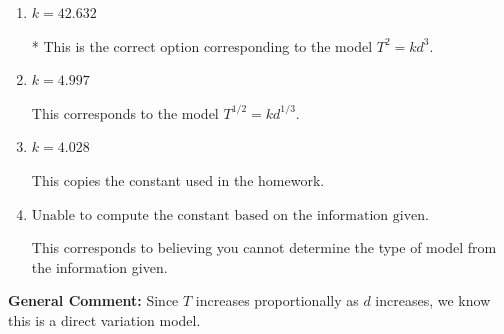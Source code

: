 \documentclass{extbook}[14pt]
\begin{document}
\begin{enumerate}
{\begin{enumerate}[label=\Alph*.]
This corresponds to the model $T^{2} = \frac{k}{d^{3}}$.
\item \( k = 42.632 \)

* This is the correct option corresponding to the model $T^{2} = k d^{3}$.
\item \( k = 4.997 \)

This corresponds to the model $T^{1/2} = k d^{1/3}$.
\item \( k = 4.028 \)

This copies the constant used in the homework.
\item \( \text{Unable to compute the constant based on the information given.} \)

This corresponds to believing you cannot determine the type of model from the information given.
\end{enumerate}

\textbf{General Comment:} Since $T$ increases proportionally as $d$ increases, we know this is a direct variation model.
}
\end{enumerate}
\end{document}
